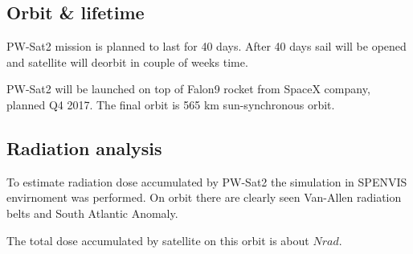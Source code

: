 \subsection{Orbit \& lifetime}
    PW-Sat2 mission is planned to last for 40 days. After 40 days sail will be opened and satellite will deorbit in couple of weeks time.
    
    PW-Sat2 will be launched on top of Falon9 rocket from SpaceX company, planned Q4 2017. The final orbit is 565 km sun-synchronous orbit.
    
    
\subsection{Radiation analysis}
    To estimate radiation dose accumulated by PW-Sat2 the simulation in SPENVIS envirnoment was performed. 
    On orbit there are clearly seen Van-Allen radiation belts and South Atlantic Anomaly. 
    
    The total dose accumulated by satellite on this orbit is about $N rad$.